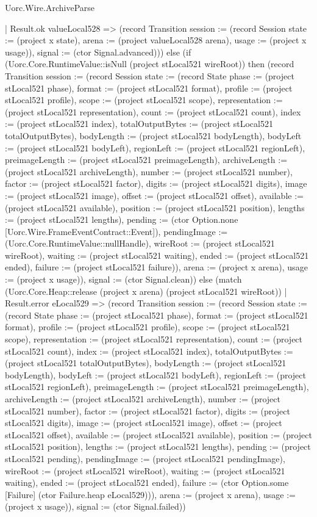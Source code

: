 \begin{lexlean}{Uorc.Wire.ArchiveParse}
\begin{semanticmodule}
{      | Result.ok valueLocal528 => (record Transition {session := (record Session {state := (project x state), arena := (project valueLocal528 arena), usage := (project x usage)}), signal := (ctor Signal.advanced)})) else (if (Uorc.Core.RuntimeValue::isNull (project stLocal521 wireRoot)) then (record Transition {session := (record Session {state := (record State {phase := (project stLocal521 phase), format := (project stLocal521 format), profile := (project stLocal521 profile), scope := (project stLocal521 scope), representation := (project stLocal521 representation), count := (project stLocal521 count), index := (project stLocal521 index), totalOutputBytes := (project stLocal521 totalOutputBytes), bodyLength := (project stLocal521 bodyLength), bodyLeft := (project stLocal521 bodyLeft), regionLeft := (project stLocal521 regionLeft), preimageLength := (project stLocal521 preimageLength), archiveLength := (project stLocal521 archiveLength), number := (project stLocal521 number), factor := (project stLocal521 factor), digits := (project stLocal521 digits), image := (project stLocal521 image), offset := (project stLocal521 offset), available := (project stLocal521 available), position := (project stLocal521 position), lengths := (project stLocal521 lengths), pending := (ctor Option.none [Uorc.Wire.FrameEventContract::Event]), pendingImage := (Uorc.Core.RuntimeValue::nullHandle), wireRoot := (project stLocal521 wireRoot), waiting := (project stLocal521 waiting), ended := (project stLocal521 ended), failure := (project stLocal521 failure)}), arena := (project x arena), usage := (project x usage)}), signal := (ctor Signal.clean)}) else (match (Uorc.Core.Heap::release (project x arena) (project stLocal521 wireRoot))
      | Result.error eLocal529 => (record Transition {session := (record Session {state := (record State {phase := (project stLocal521 phase), format := (project stLocal521 format), profile := (project stLocal521 profile), scope := (project stLocal521 scope), representation := (project stLocal521 representation), count := (project stLocal521 count), index := (project stLocal521 index), totalOutputBytes := (project stLocal521 totalOutputBytes), bodyLength := (project stLocal521 bodyLength), bodyLeft := (project stLocal521 bodyLeft), regionLeft := (project stLocal521 regionLeft), preimageLength := (project stLocal521 preimageLength), archiveLength := (project stLocal521 archiveLength), number := (project stLocal521 number), factor := (project stLocal521 factor), digits := (project stLocal521 digits), image := (project stLocal521 image), offset := (project stLocal521 offset), available := (project stLocal521 available), position := (project stLocal521 position), lengths := (project stLocal521 lengths), pending := (project stLocal521 pending), pendingImage := (project stLocal521 pendingImage), wireRoot := (project stLocal521 wireRoot), waiting := (project stLocal521 waiting), ended := (project stLocal521 ended), failure := (ctor Option.some [Failure] (ctor Failure.heap eLocal529))}), arena := (project x arena), usage := (project x usage)}), signal := (ctor Signal.failed)})
}
\end{semanticmodule}
\end{lexlean}
